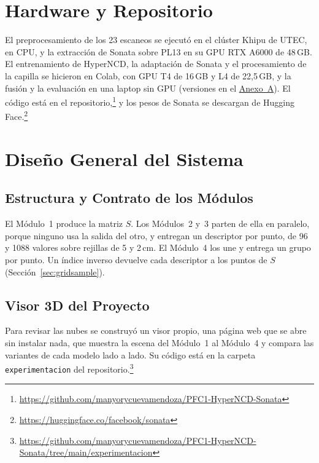 \section{Hardware y Repositorio}
\label{sec:hardware-repo}

El preprocesamiento de los 23 escaneos se ejecutó en el clúster Khipu de UTEC, en
CPU, y la extracción de Sonata sobre PL13 en su GPU RTX A6000 de 48\,GB. El
entrenamiento de HyperNCD, la adaptación de Sonata y el procesamiento de la capilla
se hicieron en Colab, con GPU T4 de 16\,GB y L4 de 22{,}5\,GB, y la fusión y la
evaluación en una laptop sin GPU (versiones en el
\hyperref[sec:anexo-software]{Anexo~A}). El código está en el
repositorio,\footnote{\url{https://github.com/manyorycuevamendoza/PFC1-HyperNCD-Sonata}}
y los pesos de Sonata se descargan de Hugging
Face.\footnote{\url{https://huggingface.co/facebook/sonata}}

\section{Diseño General del Sistema}
\label{sec:diseno}

\subsection{Estructura y Contrato de los Módulos}
\label{sec:contrato}

El Módulo~1 produce la matriz $S$. Los Módulos~2 y~3 parten de ella en paralelo,
porque ninguno usa la salida del otro, y entregan un descriptor por punto, de 96 y 1088
valores sobre rejillas de 5 y 2\,cm. El Módulo~4 los une y entrega un grupo por punto.
Un índice inverso devuelve cada descriptor a los puntos de $S$
(Sección~\ref{sec:gridsample}).

\subsection{Visor 3D del Proyecto}
\label{sec:visor}

Para revisar las nubes se construyó un visor propio, una página web que se abre
sin instalar nada, que muestra la escena del Módulo~1 al Módulo~4 y compara las
variantes de cada modelo lado a lado. Su código está en la carpeta
\texttt{experimentacion} del
repositorio.\footnote{\url{https://github.com/manyorycuevamendoza/PFC1-HyperNCD-Sonata/tree/main/experimentacion}}

